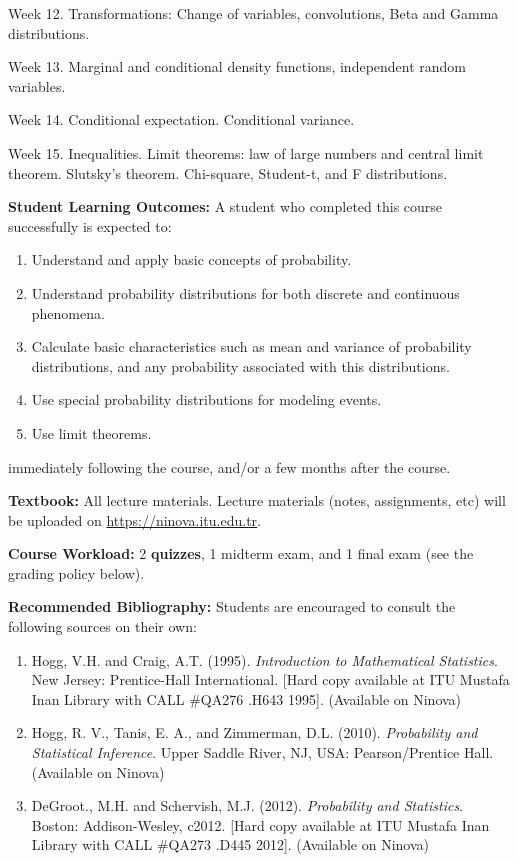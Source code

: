 \documentclass[
  12pt,
]{article}
\providecommand{\tightlist}{%
  \setlength{\itemsep}{0pt}\setlength{\parskip}{0pt}}
\begin{document}
Week 12. Transformations: Change of variables, convolutions, Beta and
Gamma distributions.

Week 13. Marginal and conditional density functions, independent random
variables.

Week 14. Conditional expectation. Conditional variance.

Week 15. Inequalities. Limit theorems: law of large numbers and central
limit theorem. Slutsky's theorem. Chi-square, Student-t, and F
distributions.

\textbf{Student Learning Outcomes:} A student who completed this course
successfully is expected to:

\begin{enumerate}
\def\labelenumi{\arabic{enumi}.}
\tightlist
\item
  Understand and apply basic concepts of probability.
\item
  Understand probability distributions for both discrete and continuous
  phenomena.
\item
  Calculate basic characteristics such as mean and variance of
  probability distributions, and any probability associated with this
  distributions.
\item
  Use special probability distributions for modeling events.
\item
  Use limit theorems.
\end{enumerate}

immediately following the course, and/or a few months after the course.

\textbf{Textbook:} All lecture materials. Lecture materials (notes,
assignments, etc) will be uploaded on
\href{Ninova}{https://ninova.itu.edu.tr}.

\textbf{Course Workload:} 2 \textbf{quizzes}, 1 midterm exam, and 1
final exam (see the grading policy below).

\textbf{Recommended Bibliography:} Students are encouraged to consult
the following sources on their own:

\begin{enumerate}
\def\labelenumi{\arabic{enumi}.}
\tightlist
\item
  Hogg, V.H. and Craig, A.T. (1995).
  \textit{Introduction to Mathematical Statistics}. New Jersey:
  Prentice-Hall International. {[}Hard copy available at ITU Mustafa
  Inan Library with CALL \#QA276 .H643 1995{]}. (Available on Ninova)
\item
  Hogg, R. V., Tanis, E. A., and Zimmerman, D.L. (2010).
  \textit{Probability and Statistical Inference}. Upper Saddle River,
  NJ, USA: Pearson/Prentice Hall. (Available on Ninova)
\item
  DeGroot., M.H. and Schervish, M.J. (2012).
  \textit{Probability and Statistics}. Boston: Addison-Wesley, c2012.
  {[}Hard copy available at ITU Mustafa Inan Library with CALL \#QA273
  .D445 2012{]}. (Available on Ninova)
\end{enumerate}
\end{document}
